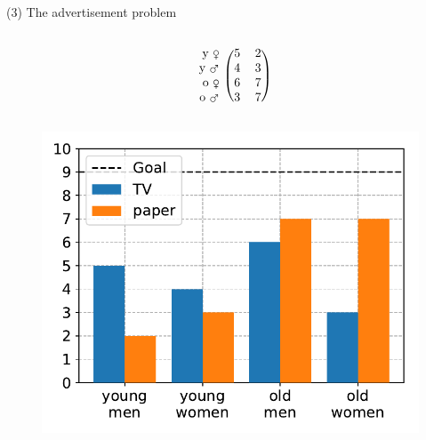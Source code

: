 \documentclass[11pt, aspectratio=149]{beamer}
\theoremstyle{plain}
\begin{document}
\begin{frame}[fragile, t]{(3) The advertisement problem}
\begin{columns}
\begin{column}{0.4\textwidth}
\[\begin{blockarray}{rcc}
			\begin{block}{r(cc)}
			\text{y \female}  & 5 &  2 \\
			\text{y \mars}  & 4 &  3 \\
			\text{o \female}  & 6 &  7 \\
			\text{o \mars}  & 3 &  7 \\
			\end{block}
			\end{blockarray}
			\]
			\vspace*{-3em}
			\begin{figure}
				\centering
				\includegraphics[width=1.0\linewidth]{figs/advertisement_statement.pdf}
			\end{figure}
		\end{column}
	\end{columns}
\end{frame}
\end{document}
